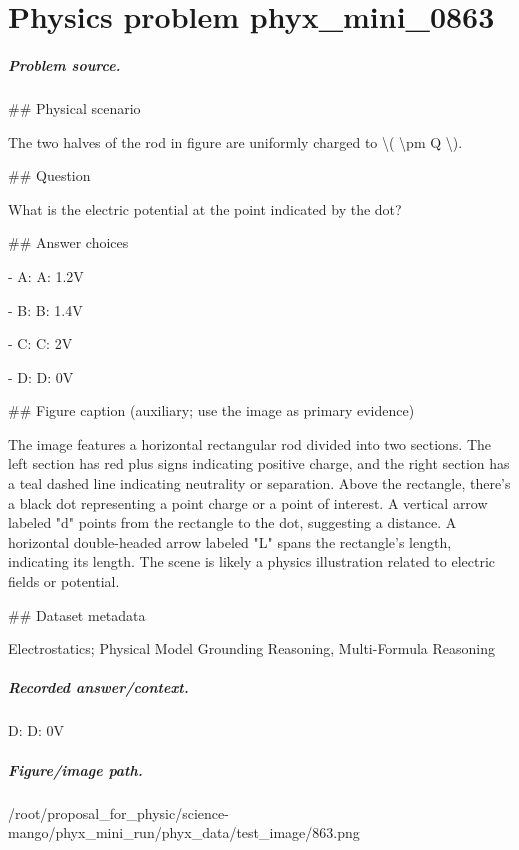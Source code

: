 
\chapter{Physics problem phyx\_mini\_0863}
\label{ch:PhyXMiniProblems_problem_phyx_mini_0863}

\paragraph{Problem source.}
\#\# Physical scenario

The two halves of the rod in figure are uniformly charged to \textbackslash{}( \textbackslash{}pm Q \textbackslash{}).

\#\# Question

What is the electric potential at the point indicated by the dot?

\#\# Answer choices

- A: A: 1.2V

- B: B: 1.4V

- C: C: 2V

- D: D: 0V

\#\# Figure caption (auxiliary; use the image as primary evidence)

The image features a horizontal rectangular rod divided into two sections. The left section has red plus signs indicating positive charge, and the right section has a teal dashed line indicating neutrality or separation. Above the rectangle, there's a black dot representing a point charge or a point of interest. A vertical arrow labeled "d" points from the rectangle to the dot, suggesting a distance. A horizontal double-headed arrow labeled "L" spans the rectangle's length, indicating its length. The scene is likely a physics illustration related to electric fields or potential.

\#\# Dataset metadata

Electrostatics; Physical Model Grounding Reasoning, Multi-Formula Reasoning

\paragraph{Recorded answer/context.}
D: D: 0V

\paragraph{Figure/image path.}
/root/proposal\_for\_physic/science-mango/phyx\_mini\_run/phyx\_data/test\_image/863.png

